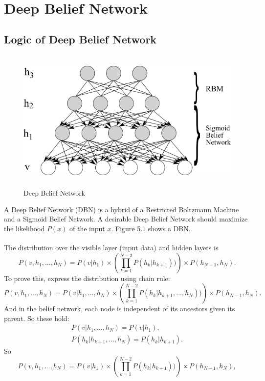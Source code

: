 \documentclass[12pt]{article}
\begin{document}
\section{Deep Belief Network}
\subsection{Logic of Deep Belief Network}
\begin{figure}[h]
\centering
\includegraphics[height=2.8in]{DBN.png}
\caption{Deep Belief Network} \label{fig:side:a}
\end{figure}
A Deep Belief Network (DBN) is a hybrid of a Restricted Boltzmann Machine and a Sigmoid Belief Network. A desirable Deep Belief Network should maximize the likelihood $P(x)$ of the input $x$. Figure 5.1 shows a DBN.\\
\\
The distribution over the visible layer (input data) and hidden layers is\begin{equation}
P(v, h_1, ..., h_N)  = P(v| h_1) \times\left(\prod_{k=1}^{N-2}  P(h_k| h_{k+1}))\right)\times P(h_{N-1},h_N).
\end{equation}
To prove this, express the distribution using chain rule:\begin{equation}
P(v, h_1, ..., h_N)  = P(v| h_1, ..., h_N) \times\left(\prod_{k=1}^{N-2}  P(h_k| h_{k+1},..., h_{N}))\right)\times P(h_{N-1},h_N).
\end{equation}
And in the belief network, each node is independent of its ancestors given its parent. So these hold:\begin{gather}
P(v| h_1, ..., h_N) = P(v|h_1),\\
P(h_k| h_{k+1},..., h_{N}) = P(h_k| h_{k+1}).
\end{gather}
So \begin{equation}
P(v, h_1, ..., h_N)  = P(v| h_1) \times\left(\prod_{k=1}^{N-2}  P(h_k| h_{k+1}))\right)\times P(h_{N-1},h_N),
\end{equation}
\end{document}
